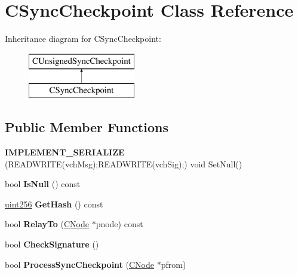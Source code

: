 \hypertarget{class_c_sync_checkpoint}{}\section{C\+Sync\+Checkpoint Class Reference}
\label{class_c_sync_checkpoint}
Inheritance diagram for C\+Sync\+Checkpoint\+:\begin{figure}[H]
\begin{center}
\leavevmode
\includegraphics[height=2.000000cm]{class_c_sync_checkpoint}
\end{center}
\end{figure}
\subsection*{Public Member Functions}
\begin{DoxyCompactItemize}
\item 
\mbox{\label{class_c_sync_checkpoint_a486fbed4827580fd77a58a29e6d69350}} 
{\bfseries I\+M\+P\+L\+E\+M\+E\+N\+T\+\_\+\+S\+E\+R\+I\+A\+L\+I\+ZE} (R\+E\+A\+D\+W\+R\+I\+TE(vch\+Msg);R\+E\+A\+D\+W\+R\+I\+TE(vch\+Sig);) void Set\+Null()
\item 
\mbox{\label{class_c_sync_checkpoint_a85528fd507577c5f8aa2c5634234f84a}} 
bool {\bfseries Is\+Null} () const
\item 
\mbox{\label{class_c_sync_checkpoint_a8b1ea6da296a69c35280c74032cd86a3}} 
\mbox{\hyperlink{classuint256}{uint256}} {\bfseries Get\+Hash} () const
\item 
\mbox{\label{class_c_sync_checkpoint_a79aa12a33c8bcae9a1748c3fc6469e7d}} 
bool {\bfseries Relay\+To} (\mbox{\hyperlink{class_c_node}{C\+Node}} $\ast$pnode) const
\item 
\mbox{\label{class_c_sync_checkpoint_a240894ca0b64430f91c751c8d1fa42a7}} 
bool {\bfseries Check\+Signature} ()
\item 
\mbox{\label{class_c_sync_checkpoint_a845c5db7e2fd34b02a162eda7381e908}} 
bool {\bfseries Process\+Sync\+Checkpoint} (\mbox{\hyperlink{class_c_node}{C\+Node}} $\ast$pfrom)
\end{DoxyCompactItemize}
